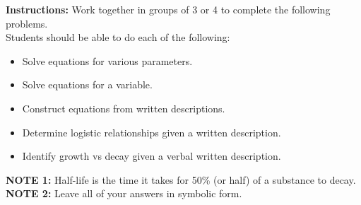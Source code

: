 



\noindent \textbf{Instructions:}  Work together in groups of  3 or 4
to complete the following problems.\\

Students should be able to do each of the following:
\begin{itemize}
\item Solve equations for various parameters.
\item Solve equations for a variable.
\item Construct equations from written descriptions.
\item Determine logistic relationships given a written description.
\item Identify growth vs decay given a verbal written description.
\end{itemize}

\noindent \textbf{NOTE 1:  }Half-life is the time it takes for 50\% (or half) of a substance to decay.\\
\noindent \textbf{NOTE 2:  }Leave all of your answers in symbolic form.


